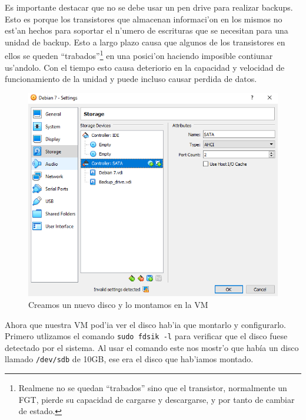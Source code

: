\documentclass[11pt]{article}
\begin{document}
		Es importante destacar que no se debe usar un pen drive para realizar backups. Esto es porque los transistores que almacenan informaci'on en los mismos no est'an hechos para soportar el n'umero de escrituras que se necesitan para una unidad de backup. Esto a largo plazo causa que algunos de los transistores en ellos se queden ``trabados''\footnote{Realmene no se quedan ``trabados'' sino que el transistor, normalmente un FGT, pierde su capacidad de cargarse y descargarse, y por tanto de cambiar de estado.} en una posici'on haciendo imposible contiunar us'andolo. Con el tiempo esto causa deteriorio en la capacidad y velocidad de funcionamiento de la unidad y puede incluso causar perdida de datos.

		\begin{figure}[H]
    			\centering
    			\includegraphics[scale=0.65]{Images/rsync/rsync_hdd_config.PNG}
    			\caption{Creamos un nuevo disco y lo montamos en la VM}
    			\label{fig:rsync_hdd_config}
		\end{figure}

		Ahora que nuestra VM pod'ia ver el disco hab'ia que montarlo y configurarlo. Primero utlizamos el comando \texttt{sudo fdsik -l} para verificar que el disco fuese detectado por el sistema. Al usar el comando este nos mostr'o que había un disco llamado \texttt{/dev/sdb} de 10GB, ese era el disco que hab'iamos montado.
\end{document}

